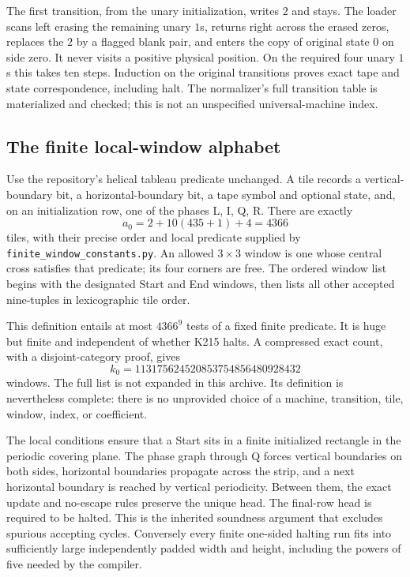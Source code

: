 \documentclass[11pt]{article}
\theoremstyle{definition}
\begin{document}
The first transition, from the unary initialization, writes $2$ and stays.
The loader scans left erasing the remaining unary $1$s, returns right across
the erased zeros, replaces the $2$ by a flagged blank pair, and enters the
copy of original state $0$ on side zero. It never visits a positive physical
position. On the required four unary $1$s this takes ten steps. Induction on
the original transitions proves exact tape and state correspondence, including
halt. The normalizer's full transition table is materialized and checked;
this is not an unspecified universal-machine index.

\subsection{The finite local-window alphabet}

Use the repository's helical tableau predicate unchanged. A tile records a
vertical-boundary bit, a horizontal-boundary bit, a tape symbol and optional
state, and, on an initialization row, one of the phases L, I, Q, R.
There are exactly
\[
 a_0=2+10(435+1)+4=4366
\]
tiles, with their precise order and local predicate supplied by
\texttt{finite\_window\_constants.py}. An allowed $3\times3$ window is one
whose central cross satisfies that predicate; its four corners are free.
The ordered window list begins with the designated Start and End windows,
then lists all other accepted nine-tuples in lexicographic tile order.

This definition entails at most $4366^9$ tests of a fixed finite predicate.
It is huge but finite and independent of whether K215 halts. A compressed
exact count, with a disjoint-category proof, gives
\[
 k_0=113175624520853754856480928432
\]
windows. The full list is not expanded in this archive. Its definition is
nevertheless complete: there is no unprovided choice of a machine, transition,
tile, window, index, or coefficient.

The local conditions ensure that a Start sits in a finite initialized
rectangle in the periodic covering plane. The phase graph through Q forces
vertical boundaries on both sides, horizontal boundaries propagate across
the strip, and a next horizontal boundary is reached by vertical periodicity.
Between them, the exact update and no-escape rules preserve the unique head.
The final-row head is required to be halted. This is the inherited soundness
argument that excludes spurious accepting cycles. Conversely every finite
one-sided halting run fits into sufficiently large independently padded
width and height, including the powers of five needed by the compiler.
\end{document}
